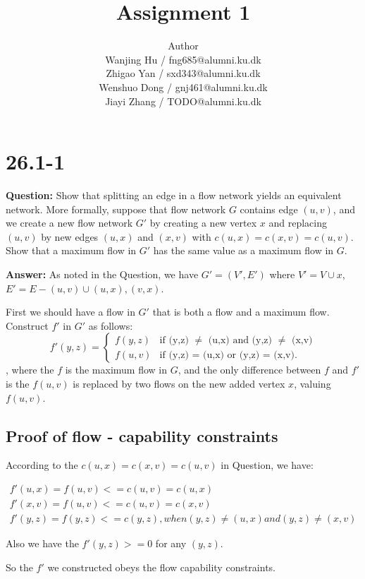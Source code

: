 \documentclass[12pt]{article}
\title{Assignment 1}
\author{Author \\
  Wanjing Hu / fng685@alumni.ku.dk  \\
  Zhigao Yan / sxd343@alumni.ku.dk  \\
  Wenshuo Dong / gnj461@alumni.ku.dk  \\
  Jiayi Zhang / TODO@alumni.ku.dk  \\
}
\begin{document}
\maketitle


\section{26.1-1}
\textbf{Question: }Show that splitting an edge in a flow network yields an equivalent network. More formally, suppose that flow network $G$ contains edge $(u, v)$, and we create a new flow network $G'$ by creating a new vertex $x$ and replacing $(u, v)$ by new edges $(u, x)$ and $(x, v)$ with $c(u, x) = c(x, v) = c(u, v)$. Show that a maximum flow in $G'$ has the same value as a maximum flow in $G$.

\textbf{Answer: }As noted in the Question, we have $G'=(V',E')$ where $V'=V\cup{x}$, $E'=E-{(u,v)}\cup{(u,x), (v, x)}$.

First we should have a flow in $G'$ that is both a flow and a maximum flow. Construct $f'$ in $G'$ as follows:
\begin{equation}
f'(y,z) = 
\begin{cases}
f(y,z) &\mbox{if (y,z) $\neq$ (u,x) and (y,z) $\neq$ (x,v)}\\
f(u,v) &\mbox{if (y,z) = (u,x) or (y,z) = (x,v)}.
\end{cases}
\end{equation}
, where the $f$ is the maximum flow in $G$, and the only difference between $f$ and $f'$ is the $f(u,v)$ is replaced by two flows on the new added vertex $x$, valuing $f(u,v)$.

\subsection{Proof of flow - capability constraints}

According to the $c(u, x) = c(x, v) = c(u, v)$ in Question, we have:

\begin{gather}
f'(u,x) = f(u,v) <= c(u,v) = c(u,x)\\ \nonumber
f'(x,v) = f(u,v)<=c(u,v) = c(x,v)\\ \nonumber
f'(y,z) = f(y,z) <= c(y,z), when (y,z) \neq (u,x) and (y,z) \neq (x,v) \nonumber
\end{gather}

Also we have the $f'(y,z)>= 0$ for any $(y,z)$.

So the $f'$ we constructed obeys the flow capability constraints.
\end{document}
